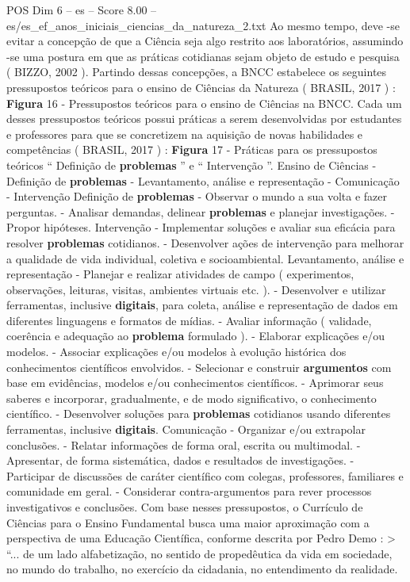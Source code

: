 \begin{textsample}{POS Dim 6 – es – Score 8.00 – es/es\_ef\_anos\_iniciais\_ciencias\_da\_natureza\_2.txt}
Ao mesmo tempo, deve -se evitar a concepção de que a Ciência seja algo restrito aos laboratórios, assumindo -se uma postura em que as práticas cotidianas sejam objeto de estudo e pesquisa ( BIZZO, 2002 ).
Partindo dessas concepções, a BNCC estabelece os seguintes pressupostos teóricos para o ensino de Ciências da Natureza ( BRASIL, 2017 ) : \textbf{Figura} 16 - Pressupostos teóricos para o ensino de Ciências na BNCC.
Cada um desses pressupostos teóricos possui práticas a serem desenvolvidas por estudantes e professores para que se concretizem na aquisição de novas habilidades e competências ( BRASIL, 2017 ) : \textbf{Figura} 17 - Práticas para os pressupostos teóricos “ Definição de \textbf{problemas} ” e “ Intervenção ”.
Ensino de Ciências - Definição de \textbf{problemas} - Levantamento, análise e representação - Comunicação - Intervenção Definição de \textbf{problemas} - Observar o mundo a sua volta e fazer perguntas. - Analisar demandas, delinear \textbf{problemas} e planejar investigações. - Propor hipóteses.
Intervenção - Implementar soluções e avaliar sua eficácia para resolver \textbf{problemas} cotidianos. - Desenvolver ações de intervenção para melhorar a qualidade de vida individual, coletiva e socioambiental.
Levantamento, análise e representação - Planejar e realizar atividades de campo ( experimentos, observações, leituras, visitas, ambientes virtuais etc. ). - Desenvolver e utilizar ferramentas, inclusive \textbf{digitais}, para coleta, análise e representação de dados em diferentes linguagens e formatos de mídias. - Avaliar informação ( validade, coerência e adequação ao \textbf{problema} formulado ). - Elaborar explicações e/ou modelos. - Associar explicações e/ou modelos à evolução histórica dos conhecimentos científicos envolvidos. - Selecionar e construir \textbf{argumentos} com base em evidências, modelos e/ou conhecimentos científicos. - Aprimorar seus saberes e incorporar, gradualmente, e de modo significativo, o conhecimento científico. - Desenvolver soluções para \textbf{problemas} cotidianos usando diferentes ferramentas, inclusive \textbf{digitais}.
Comunicação - Organizar e/ou extrapolar conclusões. - Relatar informações de forma oral, escrita ou multimodal. - Apresentar, de forma sistemática, dados e resultados de investigações. - Participar de discussões de caráter científico com colegas, professores, familiares e comunidade em geral. - Considerar contra-argumentos para rever processos investigativos e conclusões.
Com base nesses pressupostos, o Currículo de Ciências para o Ensino Fundamental busca uma maior aproximação com a perspectiva de uma Educação Científica, conforme descrita por Pedro Demo : > “... de um lado alfabetização, no sentido de propedêutica da vida em sociedade, no mundo do trabalho, no exercício da cidadania, no entendimento da realidade.

\end{textsample}
